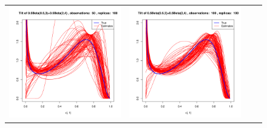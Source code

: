 \begin{figure}[h]
\begin{tabular}{cccc}

	\includegraphics[width=\textwidth/4]{../img/p05_a05_b3_p05_a2_b4/tilted/K1/densities/n50_R100.pdf}
	&
	\includegraphics[width=\textwidth/4]{../img/p05_a05_b3_p05_a2_b4/tilted/K1/densities/n100_R100.pdf}

\end{tabular}
\end{figure}

